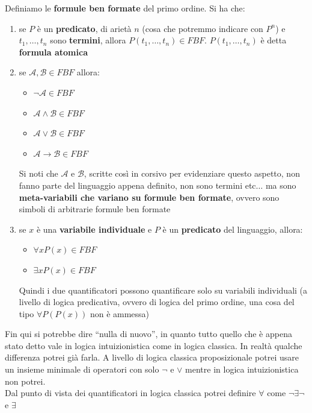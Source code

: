 \documentclass[a4paper,12pt, oneside]{book}
\begin{document}
\begin{definizione}
  Definiamo le \textbf{formule ben formate} del primo ordine. Si ha che:
  \begin{enumerate}
    \item se $P$ è un \textbf{predicato}, di arietà $n$ (cosa che potremmo
    indicare con $P^n$) e
    $t_1,\ldots, t_n$ sono \textbf{termini}, allora $P(t_1,\ldots, t_n)\in
    FBF$. $P(t_1,\ldots, t_n)$ è detta \textbf{formula atomica}
    \item se $\mathcal{A},\mathcal{B}\in FBF$ allora:
    \begin{itemize}
      \item $\neg \mathcal{A}\in FBF$
      \item $\mathcal{A}\land \mathcal{B}\in FBF$
      \item $\mathcal{A}\lor \mathcal{B}\in FBF$
      \item $\mathcal{A}\to \mathcal{B}\in FBF$
    \end{itemize}
    Si noti che $\mathcal{A}$ e $\mathcal{B}$, scritte così in corsivo per
    evidenziare questo aspetto, non fanno parte del linguaggio
    appena definito, non sono termini etc$\ldots$ ma sono \textbf{meta-variabili
      che variano su formule ben formate}, ovvero sono simboli di arbitrarie
    formule ben formate
    \item se $x$ è una \textbf{variabile individuale} e $P$ è un
    \textbf{predicato} del linguaggio, allora: 
    \begin{itemize}
      \item $\forall xP(x)\in FBF$
      \item $\exists xP(x)\in FBF$
    \end{itemize}
    Quindi i due quantificatori possono quantificare solo su variabili
    individuali (a livello di logica predicativa, ovvero di logica del primo
    ordine, una cosa del tipo $\forall P(P(x))$ non è ammessa)
  \end{enumerate}
\end{definizione}
Fin qui si potrebbe dire ``nulla di nuovo'', in quanto tutto quello che è appena
stato detto vale in logica intuizionistica come in logica classica. In realtà
qualche differenza potrei già farla. A livello di logica classica proposizionale
potrei usare un insieme minimale di operatori con solo $\neg$ e $\lor$ mentre in
logica intuizionistica non potrei. \\
Dal punto di vista dei quantificatori in
logica classica potrei definire $\forall$ come $\neg\exists\neg$ e $\exists$
\end{document}
